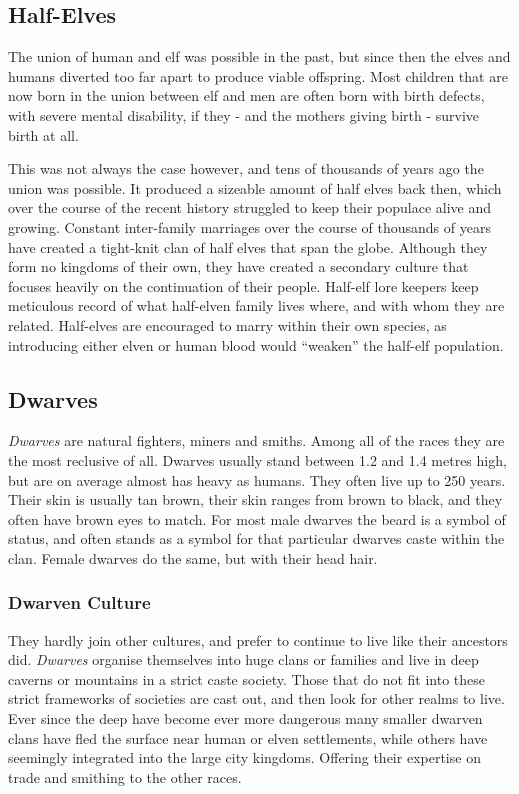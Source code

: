 \subsection*{Half-Elves}

The union of human and elf was possible in the past, but since then the elves
and humans diverted too far apart to produce viable offspring. Most children
that are now born in the union between elf and men are often born with birth
defects, with severe mental disability, if they - and the mothers giving
birth - survive birth at all.

This was not always the case however, and tens of thousands of years ago the
union was possible. It produced a sizeable amount of half elves back then,
which over the course of the recent history struggled to keep their populace
alive and growing. Constant inter-family marriages over the course of
thousands of years have created a tight-knit clan of half elves that span the
globe. Although they form no kingdoms of their own, they have created a
secondary culture that focuses heavily on the continuation of their
people. Half-elf lore keepers keep meticulous record of what half-elven family
lives where, and with whom they are related. Half-elves are encouraged to
marry within their own species, as introducing either elven or human blood
would ``weaken'' the half-elf population.

\subsection*{Dwarves}

\emph{Dwarves} are natural fighters, miners and smiths. Among all of the races
they are the most reclusive of all. Dwarves usually stand between 1.2 and 1.4
metres high, but are on average almost has heavy as humans. They often live
up to 250 years. Their skin is usually tan brown, their skin ranges from brown
to black, and they often have brown eyes to match. For most male dwarves the
beard is a symbol of status, and often stands as a symbol for that particular
dwarves caste within the clan. Female dwarves do the same, but with their
head hair.

\subsubsection*{Dwarven Culture}

They hardly join other cultures, and prefer to continue to live like their
ancestors did. \emph{Dwarves} organise themselves into huge clans or families
and live in deep caverns or mountains in a strict caste society. Those that do
not fit into these strict frameworks of societies are cast out, and then look
for other realms to live. Ever since the deep have become ever more dangerous
many smaller dwarven clans have fled the surface near human or elven
settlements, while others have seemingly integrated into the large city
kingdoms. Offering their expertise on trade and smithing to the other races.

